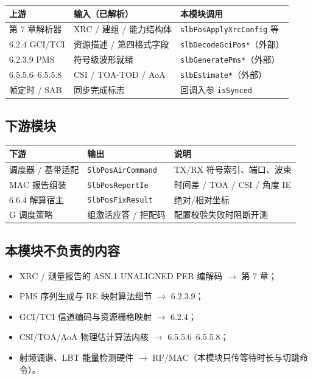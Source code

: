 \documentclass[11pt,a4paper]{ctexart}
\begin{document}
\begin{table}[h]
\centering
\small
\begin{tabular}{L{3.6cm}L{4.5cm}L{5cm}}
\toprule
\textbf{上游} & \textbf{输入（已解析）} & \textbf{本模块调用} \\
\midrule
第 7 章解析器 & XRC / 建组 / 能力结构体 & \texttt{slbPosApplyXrcConfig} 等 \\
6.2.4 GCI/TCI & 资源描述 / 第四格式字段 & \texttt{slbDecodeGciPos*}（外部） \\
6.2.3.9 PMS & 符号级波形就绪 & \texttt{slbGeneratePms*}（外部） \\
6.5.5.6--6.5.5.8 & CSI / TOA-TOD / AoA & \texttt{slbEstimate*}（外部） \\
帧定时 / SAB & 同步完成标志 & 回调入参 \texttt{isSynced} \\
\bottomrule
\end{tabular}
\end{table}

\subsection{下游模块}

\begin{table}[h]
\centering
\small
\begin{tabular}{L{3.6cm}L{4.5cm}L{5cm}}
\toprule
\textbf{下游} & \textbf{输出} & \textbf{说明} \\
\midrule
调度器 / 基带适配 & \texttt{SlbPosAirCommand} & TX/RX 符号索引、端口、波束 \\
MAC 报告组装 & \texttt{SlbPosReportIe} & 时间差 / TOA / CSI / 角度 IE \\
6.6.4 解算宿主 & \texttt{SlbPosFixResult} & 绝对/相对坐标 \\
G 调度策略 & 组激活应答 / 拒配码 & 配置校验失败时阻断开测 \\
\bottomrule
\end{tabular}
\end{table}

\subsection{本模块不负责的内容}

\begin{itemize}[nosep]
  \item XRC / 测量报告的 ASN.1 UNALIGNED PER 编解码 $\rightarrow$ 第 7 章；
  \item PMS 序列生成与 RE 映射算法细节 $\rightarrow$ 6.2.3.9；
  \item GCI/TCI 信道编码与资源栅格映射 $\rightarrow$ 6.2.4；
  \item CSI/TOA/AoA 物理估计算法内核 $\rightarrow$ 6.5.5.6--6.5.5.8；
  \item 射频调谐、LBT 能量检测硬件 $\rightarrow$ RF/MAC（本模块只传等待时长与切跳命令）。
\end{itemize}
\end{document}
